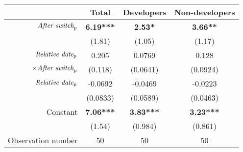 \begin{tabular}{|r|c|c|c|}
\hline
&  Total & Developers & Non-developers \\
\hline
$\mbox{\emph{After switch}}_p$ & \textbf{6.19***} & \textbf{2.53*} & \textbf{3.66**} \\
 & (1.81) & (1.05) & (1.17) \\
\hline
$\mbox{\emph{Relative date}}_p$ & 0.205 & 0.0769 & 0.128 \\
$\times \mbox{\emph{After switch}}_p$ & (0.118) & (0.0641) & (0.0924) \\
\hline
$\mbox{\emph{Relative date}}_p$ & -0.0692 & -0.0469 & -0.0223 \\
 & (0.0833) & (0.0589) & (0.0463) \\
\hline
Constant & \textbf{7.06***} & \textbf{3.83***} & \textbf{3.23***} \\
 & (1.54) & (0.984) & (0.861) \\
\hline
Observation number & 50 & 50 & 50 \\
\hline
\end{tabular}